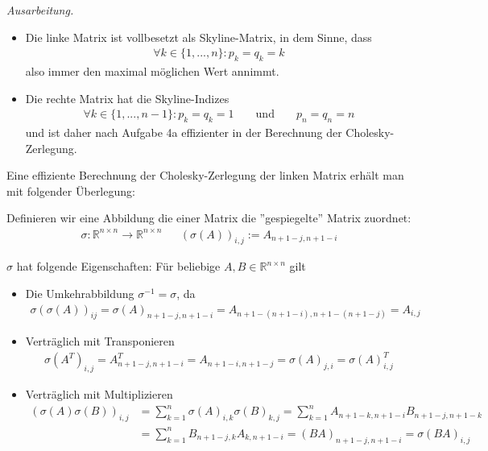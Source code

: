 \documentclass[]{article}
\newenvironment{ausarbeitung}{\vspace{3mm}\noindent\textit{Ausarbeitung.}}{}
\begin{document}
\begin{ausarbeitung}
	\begin{itemize}
		\item Die linke Matrix ist vollbesetzt als Skyline-Matrix, in dem Sinne, dass 
		\begin{align*}
			\forall k \in \{1, ..., n\}: p_k = q_k = k
		\end{align*}
		also immer den maximal möglichen Wert annimmt.
		
		\item Die rechte Matrix hat die Skyline-Indizes 
		\begin{align*}
			\forall k \in \{1, ..., n - 1\}: p_k = q_k = 1 && \text{ und } && p_n = q_n = n
		\end{align*}
		und ist daher nach Aufgabe 4a effizienter in der Berechnung der Cholesky-Zerlegung.
	\end{itemize}
	
	Eine effiziente Berechnung der Cholesky-Zerlegung der linken Matrix erhält man mit folgender Überlegung:
	
	Definieren wir eine Abbildung die einer Matrix die ''gespiegelte'' Matrix zuordnet:
	\begin{align*}
		\sigma: \mathbb{R}^{n\times n} \rightarrow \mathbb{R}^{n \times n} && (\sigma(A))_{i,j} := A_{n+1-j, n+1-i}
	\end{align*}
	
	$\sigma$ hat folgende Eigenschaften: Für beliebige $A,B \in \mathbb{R}^{n \times n}$ gilt
	
	\begin{itemize}
		\item Die Umkehrabbildung $\sigma^{-1} = \sigma$, da
			\begin{align*}
				\sigma(\sigma(A))_{ij} = \sigma(A)_{n+1-j,n+1-i} = A_{n+1-(n+1-i),n+1-(n+1-j)} = A_{i,j}
			\end{align*}
		
		\item Verträglich mit Transponieren
			\begin{align*}
				\sigma(A^T)_{i,j} = A^T_{n+1-j,n+1-i} = A_{n+1-i,n+1-j} = \sigma(A)_{j,i} = \sigma(A)^T_{i,j}
			\end{align*}
		\item Verträglich mit Multiplizieren
			\begin{align*}
				(\sigma(A)\sigma(B))_{i,j} &= \sum_{k=1}^{n}\sigma(A)_{i,k}\sigma(B)_{k,j} = \sum_{k=1}^{n} A_{n+1-k,n+1-i}B_{n+1-j,n+1-k} \\
				&= \sum_{k=1}^{n} B_{n+1-j,k}A_{k,n+1-i} = (BA)_{n+1-j,n+1-i} = \sigma(BA)_{i,j}
			\end{align*}
		

\end{itemize}
\end{ausarbeitung}
\end{document}
